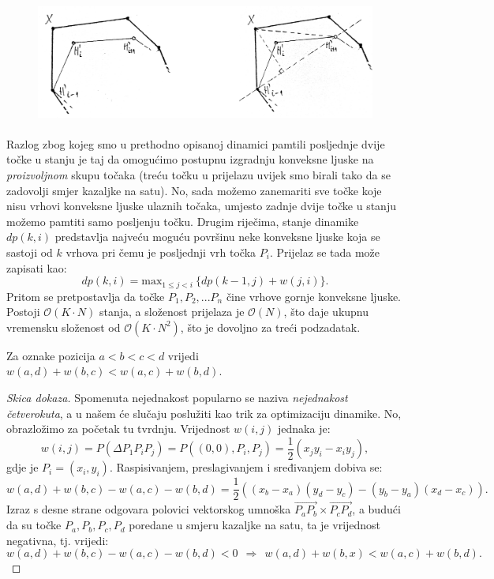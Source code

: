 \begin{figure}[h]
  \centering
  \includegraphics[height=4cm]{pic/img2.png}
\end{figure}

Razlog zbog kojeg smo u prethodno opisanoj dinamici pamtili posljednje dvije
točke u stanju je taj da omogućimo postupnu izgradnju konveksne ljuske na \textit{proizvoljnom}
skupu točaka (treću točku u prijelazu uvijek smo birali tako da se zadovolji smjer kazaljke
na satu). No, sada možemo zanemariti sve točke koje nisu vrhovi konveksne
ljuske ulaznih točaka, umjesto zadnje dvije točke u stanju možemo pamtiti
samo posljenju točku. Drugim riječima, stanje dinamike $dp(k,i)$ predstavlja
najveću moguću površinu neke konveksne ljuske koja se sastoji od $k$ vrhova
pri čemu je posljednji vrh točka $P_i$. Prijelaz se tada može zapisati kao:
\begin{equation*}
  dp(k,i) = \text{max}_{1 \le j < i}\ \{ dp(k-1, j) + w(j, i) \}.
\end{equation*}
Pritom se pretpostavlja da točke $P_1, P_2, ... P_n$ čine vrhove gornje
konveksne ljuske.
Postoji $\mathcal{O}(K \cdot N)$ stanja, a složenost prijelaza je $\mathcal{O}(N)$, što
daje ukupnu vremensku složenost od $\mathcal{O}(K \cdot N^2)$, što je dovoljno za
treći podzadatak.

\begin{zamjedba}
  \label{quadrangle}
  Za oznake pozicija $a < b < c < d$ vrijedi $w(a,d) + w(b,c) < w(a,c) + w(b,d)$.
\end{zamjedba}

\begin{proof}[Skica dokaza]
  Spomenuta nejednakost popularno se naziva \textit{nejednakost četverokuta}, a u našem će
  slučaju poslužiti kao trik za optimizaciju dinamike. No, obrazložimo
  za početak tu tvrdnju. Vrijednost $w(i,j)$ jednaka je:
  \begin{equation*}
    w(i,j) = P(\Delta P_1P_iP_j) = P((0, 0), P_i, P_j) = \frac{1}{2}(x_j y_i - x_i y_j),
  \end{equation*}
  gdje je $P_i = (x_i, y_i)$. Raspisivanjem, preslagivanjem i sređivanjem
  dobiva se:
  \begin{equation*}
    w(a,d) + w(b,c) - w(a,c) - w(b,d) = \frac{1}{2}((x_b - x_a)(y_d - y_c) - (y_b - y_a)(x_d - x_c)).
  \end{equation*}
  Izraz s desne strane odgovara polovici vektorskog umnoška $\overrightarrow{P_a P_b} \times
  \overrightarrow{P_c P_d}$, a budući da su točke $P_a, P_b, P_c, P_d$ poredane u
  smjeru kazaljke na satu, ta je vrijednost negativna, tj. vrijedi:
  \begin{equation*}
    w(a,d) + w(b,c) - w(a,c) - w(b,d) < 0\ \ \Rightarrow\ \
    w(a,d) + w(b,x) < w(a,c) + w(b,d).
  \end{equation*}
\end{proof}

